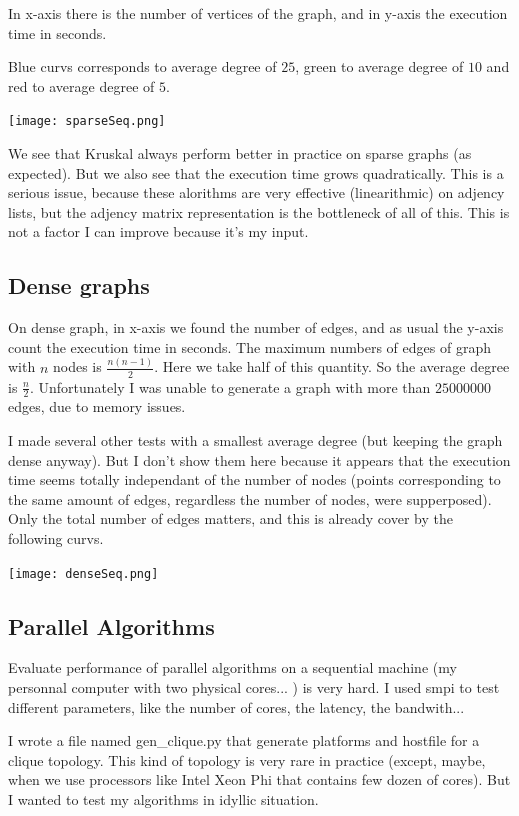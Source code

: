 \documentclass[a4paper, 10pt]{article}
\begin{document}
In x-axis there is the number of vertices of the graph, and in y-axis the execution time in seconds.  
  
Blue curvs corresponds to average degree of $25$, green to average degree of $10$ and red to average degree of $5$.  
  
\begin{center}
\texttt{[image: sparseSeq.png]}
\end{center} 
  
We see that Kruskal always perform better in practice on sparse graphs (as expected). But we also see that the execution time grows quadratically. This is a serious issue, because these alorithms are very effective (linearithmic) on adjency lists, but the adjency matrix representation is the bottleneck of all of this. This is not a factor I can improve because it's my input.  
\subsection{Dense graphs}  
On dense graph, in x-axis we found the number of edges, and as usual the y-axis count the execution time in seconds. The maximum numbers of edges of graph with $n$ nodes is $\frac{n(n-1)}{2}$. Here we take half of this quantity. So the average degree is $\frac{n}{2}$. Unfortunately I was unable to generate a graph with more than $25000000$ edges, due to memory issues.  
  
I made several other tests with a smallest average degree (but keeping the graph dense anyway). But I don't show them here because it appears that the execution time seems totally independant of the number of nodes (points corresponding to the same amount of edges, regardless the number of nodes, were supperposed). Only the total number of edges matters, and this is already cover by the following curvs.  
  
\begin{center}
\texttt{[image: denseSeq.png]}
\end{center} 
\subsection{Parallel Algorithms}
Evaluate performance of parallel algorithms on a sequential machine (my personnal computer with two physical cores... ) is very hard. I used smpi to test different parameters, like the number of cores, the latency, the bandwith...  
  
I wrote a file named gen\_clique.py that generate platforms and hostfile for a clique topology. This kind of topology is very rare in practice (except, maybe, when we use processors like Intel Xeon Phi that contains few dozen of cores). But I wanted to test my algorithms in idyllic situation.  
  
\end{document}
